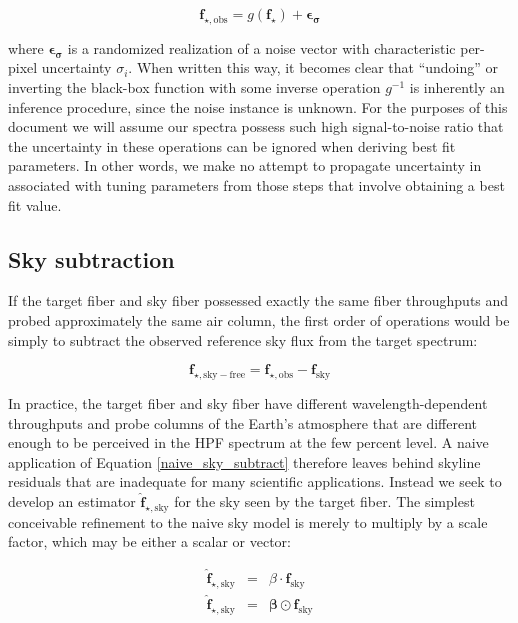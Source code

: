 \documentclass[modern]{aastex631}
\begin{document}
\begin{equation}
\mathbf{f}_{\star, \mathrm{obs}} = g(\mathbf{f}_{\star}) + \boldsymbol{\epsilon_\sigma}
\end{equation}

where $\boldsymbol{\epsilon_\sigma}$ is a randomized realization of a noise vector with characteristic per-pixel uncertainty $\sigma_i$.  When written this way, it becomes clear that ``undoing'' or inverting the black-box function with some inverse operation $g^{-1}$ is inherently an inference procedure, since the noise instance is unknown.  For the purposes of this document we will assume our spectra possess such high signal-to-noise ratio that the uncertainty in these operations can be ignored when deriving best fit parameters.  In other words, we make no attempt to propagate uncertainty in associated with tuning parameters from those steps that involve obtaining a best fit value.  

\subsection{Sky subtraction}
If the target fiber and sky fiber possessed exactly the same fiber throughputs and probed approximately the same air column, the first order of operations would be simply to subtract the observed reference sky flux from the target spectrum:

\begin{equation} \label{naive_sky_subtract}
\mathbf{f}_{\star, \mathrm{sky-free}} = \mathbf{f}_{\star, \mathrm{obs}} - \mathbf{f}_{\mathrm{sky}}
\end{equation}

In practice, the target fiber and sky fiber have different wavelength-dependent throughputs and probe columns of the Earth's atmosphere that are different enough to be perceived in the HPF spectrum at the few percent level.  A naive application of Equation \ref{naive_sky_subtract} therefore leaves behind skyline residuals that are inadequate for many scientific applications.  Instead we seek to develop an estimator $\mathbf{\hat{f}}_{\star, \mathrm{sky}}$ for the sky seen by the target fiber.  The simplest conceivable refinement to the naive sky model is merely to multiply by a scale factor, which may be either a scalar or vector:

\begin{eqnarray} 
\mathbf{\hat{f}}_{\star, \mathrm{sky}} &=& \beta\cdot\mathbf{f}_{\mathrm{sky}}\label{refined_sky_subtract_scalar}
\\
\mathbf{\hat{f}}_{\star, \mathrm{sky}} &=& \boldsymbol{\beta}\odot\mathbf{f}_{\mathrm{sky}} \label{refined_sky_subtract_vector}
\end{eqnarray}
\end{document}
